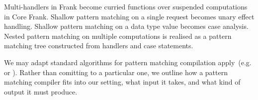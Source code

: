 \documentclass[preprint]{sigplanconf}
\newcommand{\many}{\overline}
\newcommand{\judgeword}[1]{~\mathbf{#1}~}
\newcommand{\sigentails}[1]{\mathbin{[{\text{\scriptsize ${#1}$}}]\!\text{-\!-}}\,}
\newcommand{\rt}[1]{\langle{#1}\rangle}   %
\newcommand{\makes}[4]  {#1 \sigentails{#2} {#3} \judgeword{is} {#4}}
\newcommand{\can}[4]{#1 \sigentails{#2} {#3} \judgeword{is} {#4}}
\newcommand{\makesgs}{\makes{\Gamma}{\sigs}}
\newcommand{\sigs}{\Sigma}
\newcommand{\effbox}[1]{[#1]}
\newcommand{\key}[1]{\mathsf{#1}}
\newcommand{\handleSymbol}{\mathbin{?}}
\newcommand{\handle}[2]{{#1} \handleSymbol {#2}}
\newcommand{\thunk}[1]{\{{#1}\}}
\begin{document}



Multi-handlers in Frank become curried functions over suspended
computations in Core Frank.
%
Shallow pattern matching on a single request becomes unary effect
handling. Shallow pattern matching on a data type value becomes case
analysis. Nested pattern matching on multiple computations is realised
as a pattern matching tree constructed from handlers and case
statements. 

We may adapt standard algorithms for pattern matching compilation
apply~(e.g. \cite{Augustsson85} or \cite{Maranget08}). Rather than
comitting to a particular one, we outline how a pattern matching
compiler fits into our setting, what input it takes, and what kind of
output it must produce.
\end{document}
